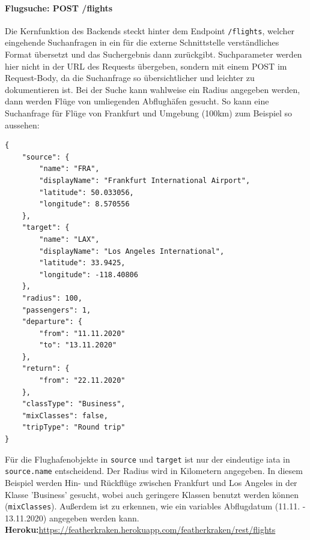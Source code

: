 \documentclass[12pt,twoside,a4paper]{article}
\begin{document}
\begin{sloppypar}
\paragraph[Flugsuche]{Flugsuche: POST /flights}
Die Kernfunktion des Backends steckt hinter dem Endpoint \texttt{/flights}, welcher eingehende Suchanfragen in ein für die externe Schnittstelle verständliches Format übersetzt und das Suchergebnis dann zurückgibt. Suchparameter werden hier nicht in der URL des Requests übergeben, sondern mit einem POST im Request-Body, da die Suchanfrage so übersichtlicher und leichter zu dokumentieren ist. Bei der Suche kann wahlweise ein Radius angegeben werden, dann werden Flüge von umliegenden Abflughäfen gesucht.
\newpage
So kann eine Suchanfrage für Flüge von Frankfurt und Umgebung (100km) zum Beispiel so aussehen:
\begin{Verbatim}
{
	"source": {
		"name": "FRA",
		"displayName": "Frankfurt International Airport",
		"latitude": 50.033056,
		"longitude": 8.570556
	},
	"target": {
		"name": "LAX",
		"displayName": "Los Angeles International",
		"latitude": 33.9425,
		"longitude": -118.40806
	},
	"radius": 100,
	"passengers": 1,
	"departure": {
		"from": "11.11.2020"
		"to": "13.11.2020"
	},
	"return": {
		"from": "22.11.2020"
	},
	"classType": "Business",
	"mixClasses": false,
	"tripType": "Round trip"
}
\end{Verbatim}
Für die Flughafenobjekte in \texttt{source} und \texttt{target} ist nur der eindeutige \acrlong{iata} in \texttt{source.name} entscheidend. Der Radius wird in Kilometern angegeben. In diesem Beispiel werden Hin- und Rückflüge zwischen Frankfurt und Los Angeles in der Klasse 'Business' gesucht, wobei auch geringere Klassen benutzt werden können (\texttt{mixClasses}). Außerdem ist zu erkennen, wie ein variables Abflugdatum (11.11. - 13.11.2020) angegeben werden kann.\\
\textbf{Heroku:}\hfill \href{https://featherkraken.herokuapp.com/featherkraken/rest/flights}{https://featherkraken.herokuapp.com/featherkraken/rest/flights}

\end{sloppypar}
\end{document}
